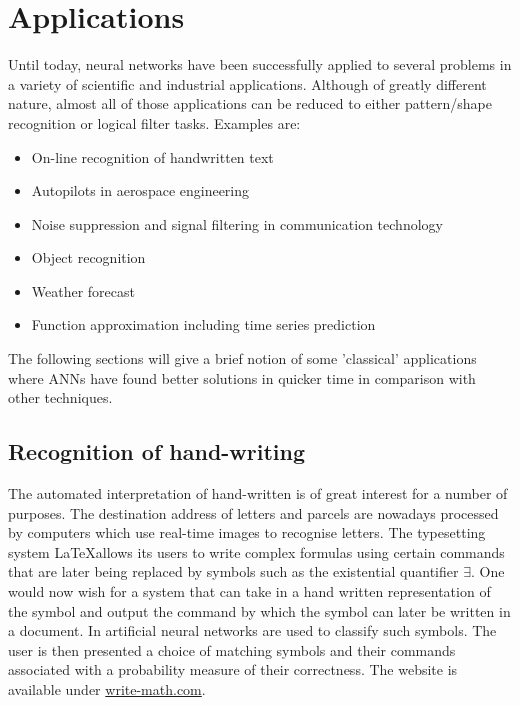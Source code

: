 \documentclass[10pt,a4paper,DIV=11]{scrreprt}
\begin{document}
\section{Applications}
Until today, neural networks have been successfully applied to several problems in a variety of scientific and industrial applications. Although of greatly different nature, almost all of those applications can be reduced to either pattern/shape recognition or logical filter tasks. Examples are:\\
\begin{itemize}
    \item On-line recognition of handwritten text
    \item Autopilots in aerospace engineering
    \item Noise suppression and signal filtering in communication technology 
    \item Object recognition
    \item Weather forecast
    \item Function approximation including time series prediction
\end{itemize}

The following sections will give a brief notion of some 'classical' applications where ANNs have found better solutions in quicker time in comparison with other techniques.
\subsection{Recognition of hand-writing}
The automated interpretation of hand-written is of great interest for a number of purposes. The destination address of letters and parcels are nowadays processed by computers which use real-time images to recognise letters. The typesetting system \LaTeX allows its users to write complex formulas using certain commands that are later being replaced by symbols such as the existential quantifier $\exists$. One would now wish for a system that can take in a hand written representation of the symbol and output the command by which the symbol can later be written in a document. In \cite{MARTIN} artificial neural networks are used to classify such symbols. The user is then presented a choice of matching symbols and their commands associated with a probability measure of their correctness. The website is available under \url{write-math.com}.
\\
\end{document}
